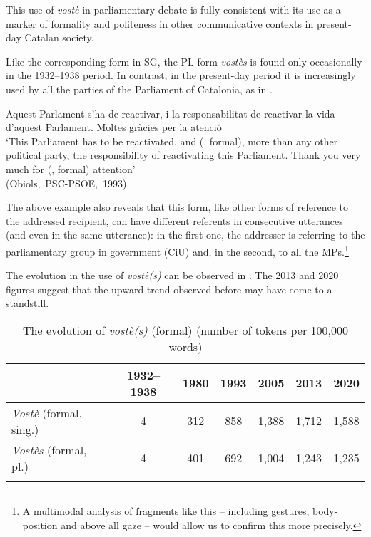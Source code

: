 \documentclass[output=paper]{langscibook}
\begin{document}
This use of \textit{vostè} in parliamentary debate is fully consistent with its use as a marker of formality and politeness in other communicative contexts in present-day Catalan society.



Like the corresponding form in SG, the PL form \textit{vostès} is found only occasionally in the 1932–1938 period. In contrast, in the present-day period it is increasingly used by all the parties of the Parliament of Catalonia, as in .


\ea\label{ex:nogue:22}
{{Aquest Parlament s’ha de reactivar, i}   {la responsabilitat de reactivar la vida d’aquest Parlament. Moltes gràcies per la}  {atenció}}\\
\glt `This Parliament has to be reactivated, and  (, formal), more than any other political party,  the responsibility of reactivating this Parliament. Thank you very much for  (, formal) attention'\\
\hfill\hbox{(Obiols, PSC-PSOE, 1993)}\\
\z 


The above example also reveals that this form, like other forms of reference to the addressed recipient, can have different referents in consecutive utterances (and even in the same utterance): in the first one, the addresser is referring to the parliamentary group in government (CiU) and, in the second, to all the MPs.\footnote{A multimodal analysis of fragments like this – including gestures, body-position and above all gaze – would allow us to confirm this more precisely.}



The evolution in the use of \textit{vostè(s)} can be observed in . The 2013 and 2020 figures suggest that the upward trend observed before may have come to a standstill.


\begin{table}
\begin{tabular}{lcccccc}
\lsptoprule
& 1932--1938 & 1980 & 1993 & 2005 & 2013 & 2020\\
\midrule
\textit{Vostè} (formal, sing.) & 4 & 312 & 858 & 1,388 & 1,712 & 1,588\\
\textit{Vostès} (formal, pl.)  & 4 & 401 & 692 & 1,004 & 1,243 & 1,235\\
\lspbottomrule
\end{tabular}
\caption{The evolution of \textit{vostè(s)} (formal) (number of tokens per 100,000 words)\label{tab:nogue:9}}
\end{table}
\end{document}
